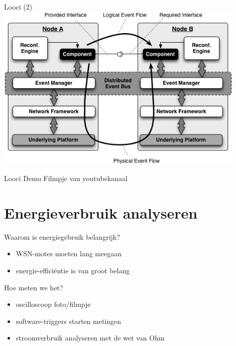 \documentclass[presentation, bigger]{beamer}
\begin{document}
\begin{frame}[label=sec-2-4]{Looci (2)}
\centering
\includegraphics[width=0.9\textwidth,keepaspectration=true]{looci/LooCIExecEnvironment.png}
\end{frame}

\begin{frame}[label=sec-2-5]{Looci Demo}
Filmpje van youtubekanaal
\end{frame}

\section{Energieverbruik analyseren}
\label{sec-3}

\begin{frame}[label=sec-3-1]{Waarom is energiegebruik belangrijk?}
\begin{itemize}
\item WSN-motes moeten lang meegaan
\item energie-efficiëntie is van groot belang
\end{itemize}
\end{frame}

\begin{frame}[label=sec-3-2]{Hoe meten we het?}
\begin{itemize}
\item oscilloscoop
foto/filmpje
\item software-triggers starten metingen
\item stroomverbruik analyseren met de wet van Ohm
\end{itemize}
\end{frame}
\end{document}
